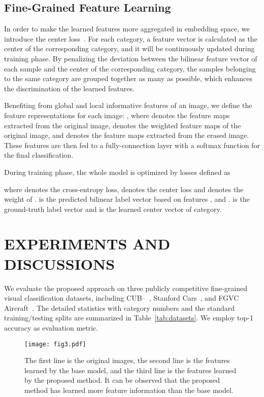 \documentclass[conference]{IEEEtran}
\begin{document}
\subsection{Fine-Grained Feature Learning}
In order to make the learned features more aggregated in embedding space, we introduce the center loss~\cite{wen2016discriminative}. For each category, a feature vector is calculated as the center of the corresponding category, and it will be continuously updated during training phase. By penalizing the deviation between the bilinear feature vector of each sample and the center of the corresponding category, the samples belonging to the same category are grouped together as many as possible, which enhances the discrimination of the learned features.

Benefiting from global and local informative features of an image, we define the feature representations for each image: , where  denotes the feature maps extracted from the original image,  denotes the weighted feature maps of the original image, and  denotes the feature maps extracted from the erased image. These features are then fed to a fully-connection layer with a softmax function for the final classification.

During training phase, the whole model is optimized by losses defined as

where  denotes the cross-entropy loss,   denotes the center loss and  denotes the weight of .  is the predicted bilinear label vector based on features ,  and .  is the ground-truth label vector and  is the learned center vector of category.

\section{EXPERIMENTS AND DISCUSSIONS}

We evaluate the proposed approach on three publicly competitive fine-grained visual classification datasets, including CUB--~\cite{wah2011caltech}, Stanford Cars~\cite{krause20133d}, and FGVC Aircraft~\cite{maji13fine}. The detailed statistics with category numbers and the standard training/testing splits are summarized in Table~\ref{tab:datasets}. We employ top-1 accuracy as evaluation metric.

\begin{figure*}[ht]
\centering
\texttt{[image: fig3.pdf]}
\caption{The first line is the original images, the second line is the features learned by the base model, and the third line is the features learned by the proposed method. It can be observed that the proposed method has learned more feature information than the base model.}
\label{fig:visualization}
\end{figure*}
\end{document}
